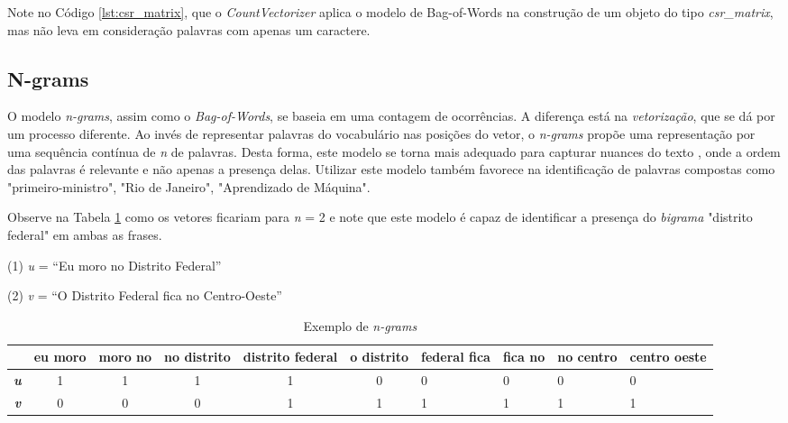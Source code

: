Note no Código \ref{lst:csr_matrix}, que o \textit{CountVectorizer} aplica o modelo de Bag-of-Words na construção de um objeto do tipo \textit{csr\_matrix}, mas não leva em consideração palavras com apenas um caractere.

\subsection{N-grams}

O modelo \textit{n-grams}, assim como o \textit{Bag-of-Words}, se baseia em uma contagem de ocorrências. A diferença está na \textit{vetorização}, que se dá por um processo diferente. Ao invés de representar palavras do vocabulário nas posições do vetor, o \textit{n-grams} propõe uma representação por uma sequência contínua de \textit{n} de palavras. Desta forma, este modelo se torna mais adequado para capturar nuances do texto \cite{Lundborg_2017}, onde a ordem das palavras é relevante e não apenas a presença delas. Utilizar este modelo também favorece na identificação de palavras compostas como "primeiro-ministro", "Rio de Janeiro", "Aprendizado de Máquina".

Observe na Tabela \ref{ngrams} como os vetores ficariam para \textit{n} = 2 e note que este modelo é capaz de identificar a presença do \textit{bigrama} "distrito federal" em ambas as frases.


\begin{samepage}
(1) \textit{u} = “Eu moro no Distrito Federal”

\nopagebreak

(2) \textit{v} = “O Distrito Federal fica no Centro-Oeste”
\end{samepage}

\begin{center}
\begin{table}[htbp]
\centering
\begin{tabular}{ccccccllll}
\hline
 & \textbf{eu moro} & \textbf{moro no} & \textbf{no distrito} & \textbf{distrito federal} & \textbf{o distrito} & \textbf{federal fica} & \textbf{fica no} & \textbf{no centro} & \textbf{centro oeste} \\ \hline
\textit{\textbf{u}} & 1 & 1 & 1 & 1 & 0 & 0 & 0 & 0 & 0 \\
\textit{\textbf{v}} & 0 & 0 & 0 & 1 & 1 & 1 & 1 & 1 & 1
\end{tabular}
\caption{Exemplo de \textit{n-grams}}
\label{ngrams}
\end{table}
\end{center}




